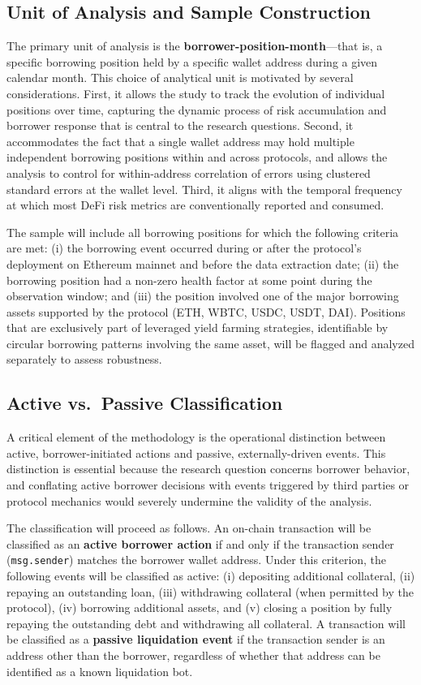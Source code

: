 \subsection{Unit of Analysis and Sample Construction}

The primary unit of analysis is the \textbf{borrower-position-month}—that is, a specific borrowing position held by a specific wallet address during a given calendar month. This choice of analytical unit is motivated by several considerations. First, it allows the study to track the evolution of individual positions over time, capturing the dynamic process of risk accumulation and borrower response that is central to the research questions. Second, it accommodates the fact that a single wallet address may hold multiple independent borrowing positions within and across protocols, and allows the analysis to control for within-address correlation of errors using clustered standard errors at the wallet level. Third, it aligns with the temporal frequency at which most DeFi risk metrics are conventionally reported and consumed.

The sample will include all borrowing positions for which the following criteria are met: (i) the borrowing event occurred during or after the protocol's deployment on Ethereum mainnet and before the data extraction date; (ii) the borrowing position had a non-zero health factor at some point during the observation window; and (iii) the position involved one of the major borrowing assets supported by the protocol (ETH, WBTC, USDC, USDT, DAI). Positions that are exclusively part of leveraged yield farming strategies, identifiable by circular borrowing patterns involving the same asset, will be flagged and analyzed separately to assess robustness.

\subsection{Active vs.\ Passive Classification}

A critical element of the methodology is the operational distinction between active, borrower-initiated actions and passive, externally-driven events. This distinction is essential because the research question concerns borrower behavior, and conflating active borrower decisions with events triggered by third parties or protocol mechanics would severely undermine the validity of the analysis.

The classification will proceed as follows. An on-chain transaction will be classified as an \textbf{active borrower action} if and only if the transaction sender (\texttt{msg.sender}) matches the borrower wallet address. Under this criterion, the following events will be classified as active: (i) depositing additional collateral, (ii) repaying an outstanding loan, (iii) withdrawing collateral (when permitted by the protocol), (iv) borrowing additional assets, and (v) closing a position by fully repaying the outstanding debt and withdrawing all collateral. A transaction will be classified as a \textbf{passive liquidation event} if the transaction sender is an address other than the borrower, regardless of whether that address can be identified as a known liquidation bot.

